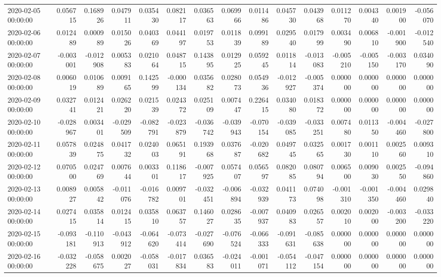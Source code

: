 \begin{tabular}{lrrrrrrrrrrrrrr}
2020-02-05 00:00:00 & 0.056715 & 0.168926 & 0.047911 & 0.035430 & 0.082117 & 0.036563 & 0.069966 & 0.011486 & 0.045730 & 0.043968 & 0.011270 & 0.004340 & 0.001900 & -0.056070 \\
2020-02-06 00:00:00 & 0.012489 & 0.000989 & 0.015026 & 0.040369 & 0.044197 & 0.019753 & 0.011839 & 0.099189 & 0.029540 & 0.017999 & 0.003490 & 0.006810 & -0.001900 & -0.012540 \\
2020-02-07 00:00:00 & -0.003001 & -0.012908 & 0.005383 & 0.021064 & 0.048715 & 0.143895 & 0.012925 & 0.059245 & 0.011814 & -0.013083 & -0.005210 & -0.005150 & -0.003170 & 0.034090 \\
2020-02-08 00:00:00 & 0.006019 & 0.010689 & 0.009165 & 0.142599 & -0.000134 & 0.035682 & 0.028073 & 0.054936 & -0.012927 & -0.005374 & 0.000000 & 0.000000 & 0.000000 & 0.000000 \\
2020-02-09 00:00:00 & 0.032741 & 0.012421 & 0.026220 & 0.021539 & 0.024372 & 0.025109 & 0.007447 & 0.226415 & 0.034080 & 0.018372 & 0.000000 & 0.000000 & 0.000000 & 0.000000 \\
2020-02-10 00:00:00 & -0.028967 & 0.003401 & -0.029509 & -0.082791 & -0.023879 & -0.036742 & -0.039943 & -0.070154 & -0.039085 & -0.033251 & 0.007480 & 0.011350 & -0.004460 & -0.027800 \\
2020-02-11 00:00:00 & 0.057839 & 0.024875 & 0.041732 & 0.024003 & 0.065191 & 0.193968 & 0.037687 & -0.020682 & 0.049745 & 0.032565 & 0.001730 & 0.001110 & 0.002560 & 0.009310 \\
2020-02-12 00:00:00 & 0.070500 & 0.024769 & 0.007644 & 0.003301 & 0.118617 & -0.007925 & 0.057407 & 0.056597 & 0.082085 & 0.080794 & 0.006500 & 0.009030 & 0.002550 & -0.094860 \\
2020-02-13 00:00:00 & 0.008927 & 0.005842 & -0.011076 & -0.016782 & 0.009701 & -0.032451 & -0.006894 & -0.032939 & 0.041173 & 0.074098 & -0.001310 & -0.001350 & -0.004460 & 0.029840 \\
2020-02-14 00:00:00 & 0.027415 & 0.035814 & 0.012415 & 0.035810 & 0.063757 & 0.146027 & 0.028635 & -0.007937 & 0.040983 & 0.026557 & 0.002010 & 0.002000 & -0.003200 & -0.033220 \\
2020-02-15 00:00:00 & -0.093181 & -0.110913 & -0.043912 & -0.064620 & -0.073414 & -0.027690 & -0.076524 & -0.066333 & -0.091631 & -0.085638 & 0.000000 & 0.000000 & 0.000000 & 0.000000 \\
2020-02-16 00:00:00 & -0.032228 & -0.058675 & 0.002027 & -0.058031 & -0.017834 & 0.036583 & -0.024011 & -0.001071 & -0.054112 & -0.047154 & 0.000000 & 0.000000 & 0.000000 & 0.000000 \\

\end{tabular}
